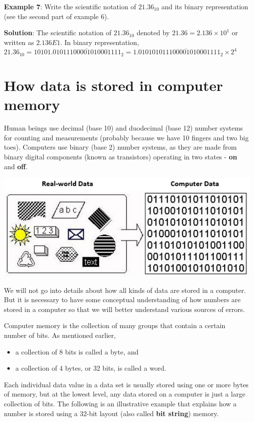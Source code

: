 \documentclass[
]{book}
\begin{document}
\textbf{Example 7}: Write the scientific notation of \(21.36_{10}\) and its binary representation (see the second part of example 6).

\textbf{Solution}: The scientific notation of \(21.36_{10}\) denoted by \(21.36 = 2.136\times 10^{1}\) or written as \(2.136E1\). In binary representation, \(21.36_{10} = 10101.\overline{01011100001010001111}_2 = 1.0101\overline{01011100001010001111}_2\times 2^4\)

\hypertarget{how-data-is-stored-in-computer-memory}{%
\section{How data is stored in computer memory}\label{how-data-is-stored-in-computer-memory}}

Human beings use decimal (base 10) and duodecimal (base 12) number systems for counting and measurements (probably because we have 10 fingers and two big toes). Computers use binary (base 2) number systems, as they are made from binary digital components (known as transistors) operating in two states - \textbf{on} and \textbf{off}.

\begin{center}\includegraphics[width=0.65\linewidth]{img02/w02-Realworld-Computer-Data} \end{center}

We will not go into details about how all kinds of data are stored in a computer. But it is necessary to have some conceptual understanding of how numbers are stored in a computer so that we will better understand various sources of errors.

Computer memory is the collection of many groups that contain a certain number of bits. As mentioned earlier,

\begin{itemize}
\item
  a collection of 8 bits is called a byte, and
\item
  a collection of 4 bytes, or 32 bits, is called a word.
\end{itemize}

Each individual data value in a data set is usually stored using one or more bytes of memory, but at the lowest level, any data stored on a computer is just a large collection of bits. The following is an illustrative example that explains how a number is stored using a 32-bit layout (also called \textbf{bit string}) memory.
\end{document}
